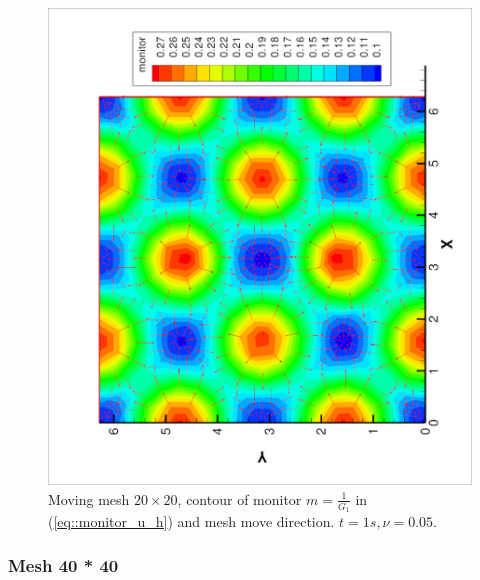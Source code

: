 \documentclass{article}
\begin{document}
 \begin{figure}[ht]
   \centering
   \includegraphics[width = 1.0\textwidth, angle = -90]{./moving20_movedirection.eps}
   \caption{\small Moving mesh $20 \times 20$,
     contour of monitor $m = \frac{1}{G_1}$ in (\ref{eq::monitor_u_h})
     and mesh move direction. $t = 1s, \nu = 0.05$.}
   \label{fig::moving20_monitor}
 \end{figure}

\subsubsection{Mesh 40 * 40}
\end{document}
